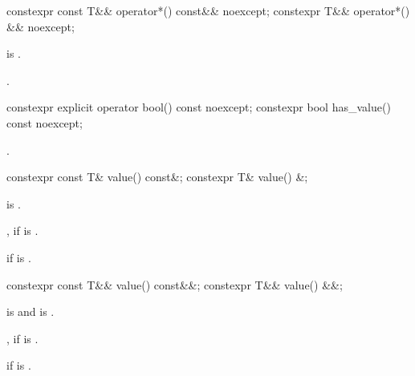 %
\begin{itemdecl}
constexpr const T&& operator*() const&& noexcept;
constexpr T&& operator*() && noexcept;
\end{itemdecl}

\begin{itemdescr}
\pnum
\hardexpects
{} is .

\pnum
\returns
{}.
\end{itemdescr}

%
%
\begin{itemdecl}
constexpr explicit operator bool() const noexcept;
constexpr bool has_value() const noexcept;
\end{itemdecl}

\begin{itemdescr}
\pnum
\returns
{}.
\end{itemdescr}

%
\begin{itemdecl}
constexpr const T& value() const&;
constexpr T& value() &;
\end{itemdecl}

\begin{itemdescr}
\pnum
\mandates
{} is .

\pnum
\returns
{}, if  is .

\pnum
\throws
{} if  is .
\end{itemdescr}

%
\begin{itemdecl}
constexpr const T&& value() const&&;
constexpr T&& value() &&;
\end{itemdecl}

\begin{itemdescr}
\pnum
\mandates
{} is  and  is .

\pnum
\returns
{}, if  is .

\pnum
\throws
{} if  is .
\end{itemdescr}

